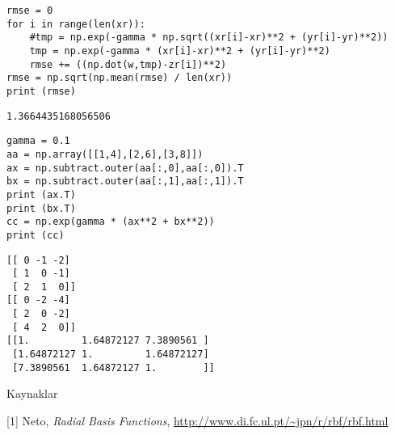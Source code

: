 \documentclass[12pt,fleqn]{article}\usepackage{../../common}
\begin{document}
\begin{verbatim}
rmse = 0
for i in range(len(xr)):
    #tmp = np.exp(-gamma * np.sqrt((xr[i]-xr)**2 + (yr[i]-yr)**2))
    tmp = np.exp(-gamma * (xr[i]-xr)**2 + (yr[i]-yr)**2)
    rmse += ((np.dot(w,tmp)-zr[i])**2)
rmse = np.sqrt(np.mean(rmse) / len(xr))
print (rmse)
\end{verbatim}

\begin{verbatim}
1.3664435168056506
\end{verbatim}

















\begin{verbatim}
gamma = 0.1
aa = np.array([[1,4],[2,6],[3,8]])
ax = np.subtract.outer(aa[:,0],aa[:,0]).T
bx = np.subtract.outer(aa[:,1],aa[:,1]).T
print (ax.T)
print (bx.T)
cc = np.exp(gamma * (ax**2 + bx**2))
print (cc)
\end{verbatim}

\begin{verbatim}
[[ 0 -1 -2]
 [ 1  0 -1]
 [ 2  1  0]]
[[ 0 -2 -4]
 [ 2  0 -2]
 [ 4  2  0]]
[[1.         1.64872127 7.3890561 ]
 [1.64872127 1.         1.64872127]
 [7.3890561  1.64872127 1.        ]]
\end{verbatim}














Kaynaklar

[1] Neto, {\em Radial Basis Functions}, \url{http://www.di.fc.ul.pt/~jpn/r/rbf/rbf.html}
\end{document}
